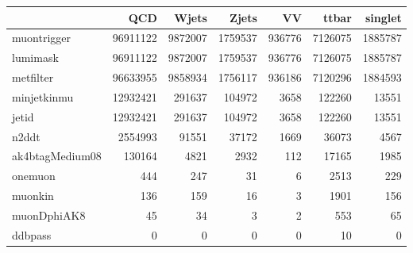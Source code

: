 \begin{tabular}{lrrrrrr}
\toprule
 & QCD & Wjets & Zjets & VV & ttbar & singlet \\
\midrule
muontrigger & 96911122 & 9872007 & 1759537 & 936776 & 7126075 & 1885787 \\
lumimask & 96911122 & 9872007 & 1759537 & 936776 & 7126075 & 1885787 \\
metfilter & 96633955 & 9858934 & 1756117 & 936186 & 7120296 & 1884593 \\
minjetkinmu & 12932421 & 291637 & 104972 & 3658 & 122260 & 13551 \\
jetid & 12932421 & 291637 & 104972 & 3658 & 122260 & 13551 \\
n2ddt & 2554993 & 91551 & 37172 & 1669 & 36073 & 4567 \\
ak4btagMedium08 & 130164 & 4821 & 2932 & 112 & 17165 & 1985 \\
onemuon & 444 & 247 & 31 & 6 & 2513 & 229 \\
muonkin & 136 & 159 & 16 & 3 & 1901 & 156 \\
muonDphiAK8 & 45 & 34 & 3 & 2 & 553 & 65 \\
ddbpass & 0 & 0 & 0 & 0 & 10 & 0 \\
\bottomrule
\end{tabular}
